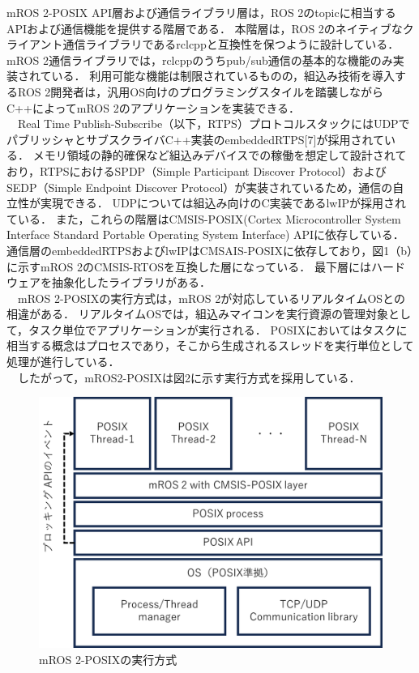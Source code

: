 \documentclass[11pt]{ujarticle}
\begin{document}
mROS 2-POSIX API層および通信ライブラリ層は，ROS 2のtopicに相当するAPIおよび通信機能を提供する階層である．
本階層は，ROS 2のネイティブなクライアント通信ライブラリであるrclcppと互換性を保つように設計している．
mROS 2通信ライブラリでは，rclcppのうちpub/sub通信の基本的な機能のみ実装されている．
利用可能な機能は制限されているものの，組込み技術を導入するROS 2開発者は，汎用OS向けのプログラミングスタイルを踏襲しながらC++によってmROS 2のアプリケーションを実装できる．
\\　Real Time Publish-Subscribe（以下，RTPS）プロトコルスタックにはUDPでパブリッシャとサブスクライバC++実装のembeddedRTPS[7]が採用されている．
メモリ領域の静的確保など組込みデバイスでの稼働を想定して設計されており，RTPSにおけるSPDP（Simple Participant Discover Protocol）およびSEDP（Simple Endpoint Discover Protocol）が実装されているため，通信の自立性が実現できる．
UDPについては組込み向けのC実装であるlwIPが採用されている．
また，これらの階層はCMSIS-POSIX(Cortex Microcontroller System Interface Standard Portable Operating System Interface) APIに依存している．
通信層のembeddedRTPSおよびlwIPはCMSAIS-POSIXに依存しており，図1（b）に示すmROS 2のCMSIS-RTOSを互換した層になっている．
最下層にはハードウェアを抽象化したライブラリがある．
\\　mROS 2-POSIXの実行方式は，mROS 2が対応しているリアルタイムOSとの相違がある．
リアルタイムOSでは，組込みマイコンを実行資源の管理対象として，タスク単位でアプリケーションが実行される．
POSIXにおいてはタスクに相当する概念はプロセスであり，そこから生成されるスレッドを実行単位として処理が進行している．
\\　したがって，mROS2-POSIXは図2に示す実行方式を採用している．
\begin{figure}[t]
	\includegraphics[width=0.9\linewidth]{./src/fig2_execution_structure.png}
	\caption{mROS 2-POSIXの実行方式}
  \label{fig:arch}
\end{figure}
\end{document}
